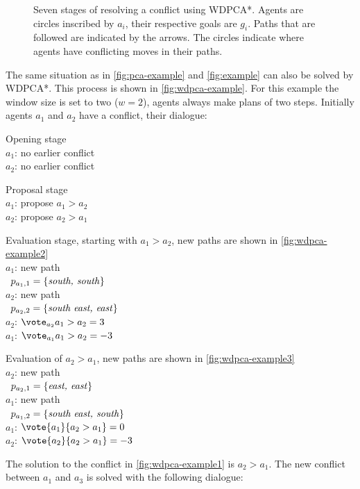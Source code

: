 \begin{figure}
    \caption{Seven stages of resolving a conflict using WDPCA*. Agents are 
        circles inscribed
        by $a_i$, their respective goals are $g_i$. Paths that are followed are
        indicated by the arrows. The circles indicate where agents have 
        conflicting moves in their paths.}
    \label{fig:wdpca-example}
\end{figure}

The same situation as in \autoref{fig:pca-example} and \autoref{fig:example} 
can also be solved by WDPCA*. This process is shown in 
\autoref{fig:wdpca-example}. For this example the window size is set to two ($w 
= 2$), 
agents always make plans of two steps. Initially agents $a_1$ and $a_2$ have a 
conflict, their dialogue:

Opening stage
\\ \-\qquad $a_1$: no earlier conflict
\\ \-\qquad $a_2$: no earlier conflict

Proposal stage
\\ \-\qquad $a_1$: propose $a_1 > a_2$
\\ \-\qquad $a_2$: propose $a_2 > a_1$

Evaluation stage, starting with $a_1 > a_2$, new paths are shown in 
\autoref{fig:wdpca-example2}
\\ \-\qquad $a_1$: new path
\\ \-\qquad\quad\,\; $p_{a_1,1} = \{\text{\emph{south, south}}\}$
\\ \-\qquad $a_2$: new path
\\ \-\qquad\quad\,\; $p_{a_2,2} = \{\text{\emph{south east, east}}\}$
\\ \-\qquad $a_2$: $\vote_{a_2}{a_1 > a_2} = 3$
\\ \-\qquad $a_1$: $\vote_{a_1}{a_1 > a_2} = -3$

Evaluation of $a_2 > a_1$, new paths are shown in \autoref{fig:wdpca-example3}
\\ \-\qquad $a_2$: new path
\\ \-\qquad\quad\,\; $p_{a_2,1} = \{\text{\emph{east, east}}\}$
\\ \-\qquad $a_1$: new path
\\ \-\qquad\quad\,\; $p_{a_1,2} = \{\text{\emph{south east, south}}\}$
\\ \-\qquad $a_1$: $\vote{a_1}{a_2 > a_1} = 0$
\\ \-\qquad $a_2$: $\vote{a_2}{a_2 > a_1} = -3$

The solution to the conflict in \autoref{fig:wdpca-example1} is $a_2 > a_1$. 
The new conflict between $a_1$ and $a_3$ is solved with the following dialogue:

